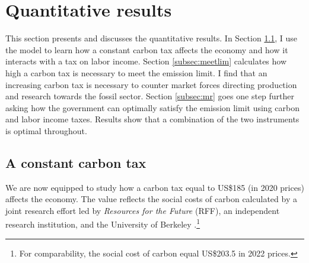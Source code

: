 \section{Quantitative results}\label{sec:res}

This section presents and discusses the quantitative results. 
In Section \ref{subsec:exp}, I use the model to learn how a constant carbon tax affects the economy and how it interacts with a tax on labor income. Section \ref{subsec:meetlim} calculates how high a carbon tax is necessary to meet the emission limit. I find that an increasing carbon tax is necessary to counter market forces directing production and research towards the fossil sector. 
Section \ref{subsec:mr} goes one step further asking  how the government can optimally satisfy the emission limit using carbon and labor income taxes. Results show that a combination of the two instruments is optimal throughout. 


\subsection{A constant carbon tax}\label{subsec:exp}


We are now equipped to study how a carbon tax  equal to US\$185 (in 2020 prices) affects the economy. The value reflects the social costs of carbon calculated by a joint research effort led by \textit{Resources for the Future} (RFF), an independent research institution, and the University of Berkeley \citep{Rennert2022ComprehensiveCO2}.\footnote{  For comparability, the social cost of carbon equal US\$203.5 in 2022 prices.}


